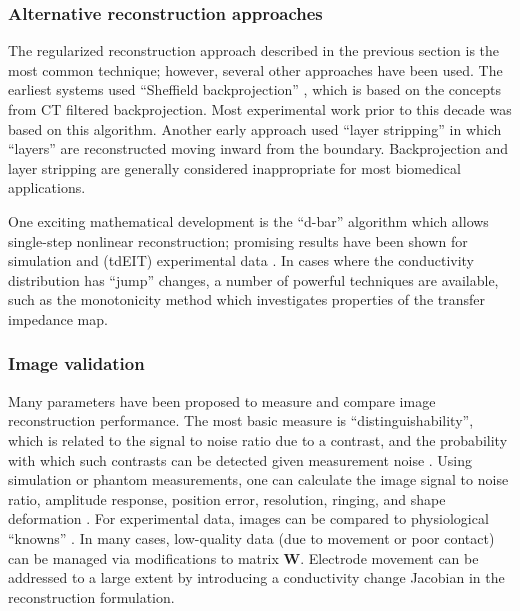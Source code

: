 \documentclass[10pt,journal]{IEEEtran}\def\TBLWIDA{15mm}\def\TBLWIDB{60mm}
\newcommand{\WB}{\mathbf{W}}
\begin{document}
\subsubsection{Alternative reconstruction approaches}
The regularized reconstruction approach described in the
previous section is the most common technique; however, several
other approaches have been used. The earliest systems used
``Sheffield backprojection'' \cite{Brown1987Sheffield},
which is based on the concepts from CT filtered backprojection.
Most experimental work prior to this decade was based on this algorithm.
Another early approach used ``layer stripping'' \cite{Somersalo1991Layer}
in which ``layers'' are reconstructed moving inward from the boundary.
Backprojection and layer stripping are generally considered inappropriate for most biomedical applications.

One exciting mathematical development is the ``d-bar'' algorithm
which allows single-step nonlinear reconstruction; promising
results have been shown for simulation and (tdEIT) experimental
data  \cite{Herrera2015Direct}.
In cases where the conductivity distribution has ``jump'' changes,
a number of powerful techniques are available, such as the
monotonicity method \cite{Tamburrino2002Monotonicity} which
investigates properties of the transfer impedance map.


\subsubsection{Image validation}

Many parameters have been proposed to measure and compare
image reconstruction performance. The most basic measure
is ``distinguishability'', which is related to the signal to
noise ratio due to a contrast, and the probability with
which such contrasts can be detected given measurement
noise \cite{Isaacson1986Distinguishability, Lionheart2001Optimal}.
 Using simulation or phantom
measurements, one can calculate the
image signal to noise ratio,
amplitude response,
position error,
resolution, ringing, and shape deformation \cite{Adler2009GREIT}.
For experimental data, images can be compared to 
physiological ``knowns'' \cite{Grychtol2014Validation}.
In many cases, low-quality data (due to movement or
poor contact) can be managed
\cite{Mamatjan2013Quality}
 via modifications to matrix $\WB$.
Electrode movement can be addressed to a large extent by introducing
a conductivity change Jacobian \cite{Soleimani2006Movement} in
the reconstruction formulation.
\end{document}
